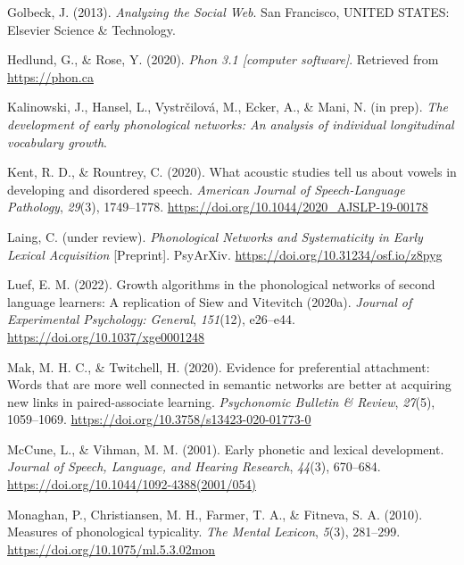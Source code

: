 \documentclass[
  man]{apa6}
\newlength{\cslhangindent}
\newlength{\cslentryspacingunit} %
\newenvironment{CSLReferences}[2] %
 {%
  \setlength{\parindent}{0pt}
  \ifodd #1
  \let\oldpar\par
  \def\par{\hangindent=\cslhangindent\oldpar}
  \fi
  \setlength{\parskip}{#2\cslentryspacingunit}
 }%
 {}
\begin{document}
\begin{CSLReferences}{1}{0}
\leavevmode{}%
Golbeck, J. (2013). \emph{Analyzing the {Social} {Web}}. San Francisco, UNITED STATES: Elsevier Science \& Technology.

\leavevmode{}%
Hedlund, G., \& Rose, Y. (2020). \emph{Phon 3.1 {[}computer software{]}}. Retrieved from \url{https://phon.ca}

\leavevmode{}%
Kalinowski, J., Hansel, L., Vystrčilová, M., Ecker, A., \& Mani, N. (in prep). \emph{The development of early phonological networks: {An} analysis of individual longitudinal vocabulary growth}.

\leavevmode{}%
Kent, R. D., \& Rountrey, C. (2020). What acoustic studies tell us about vowels in developing and disordered speech. \emph{American Journal of Speech-Language Pathology}, \emph{29}(3), 1749--1778. \url{https://doi.org/10.1044/2020_AJSLP-19-00178}

\leavevmode{}%
Laing, C. (under review). \emph{Phonological {Networks} and {Systematicity} in {Early} {Lexical} {Acquisition}} {[}Preprint{]}. PsyArXiv. \url{https://doi.org/10.31234/osf.io/z8pyg}

\leavevmode{}%
Luef, E. M. (2022). Growth algorithms in the phonological networks of second language learners: {A} replication of {Siew} and {Vitevitch} (2020a). \emph{Journal of Experimental Psychology: General}, \emph{151}(12), e26--e44. \url{https://doi.org/10.1037/xge0001248}

\leavevmode{}%
Mak, M. H. C., \& Twitchell, H. (2020). Evidence for preferential attachment: Words that are more well connected in semantic networks are better at acquiring new links in paired-associate learning. \emph{Psychonomic Bulletin \& Review}, \emph{27}(5), 1059--1069. \url{https://doi.org/10.3758/s13423-020-01773-0}

\leavevmode{}%
McCune, L., \& Vihman, M. M. (2001). Early phonetic and lexical development. \emph{Journal of Speech, Language, and Hearing Research}, \emph{44}(3), 670--684. \url{https://doi.org/10.1044/1092-4388(2001/054)}

\leavevmode{}%
Monaghan, P., Christiansen, M. H., Farmer, T. A., \& Fitneva, S. A. (2010). Measures of phonological typicality. \emph{The Mental Lexicon}, \emph{5}(3), 281--299. \url{https://doi.org/10.1075/ml.5.3.02mon}


\end{CSLReferences}
\end{document}
